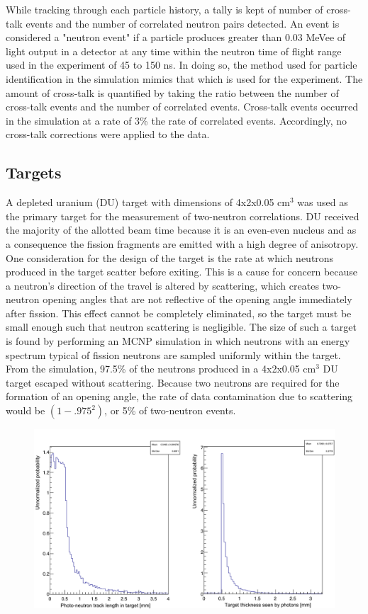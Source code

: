While tracking through each particle history, a tally is kept of number of cross-talk events and the number of correlated neutron pairs detected.
An event is considered a "neutron event" if a particle produces greater than 0.03 MeVee of light output in a detector at any time within the neutron time of flight range used in the experiment of 45 to 150 ns.
In doing so, the method used for particle identification in the simulation mimics that which is used for the experiment.
The amount of cross-talk is quantified by taking the ratio between the number of cross-talk events and the number of correlated events.
Cross-talk events occurred in the simulation at a rate of 3\% the rate of correlated events.
Accordingly, no cross-talk corrections were applied to the data.

\subsection{Targets}
A depleted uranium (DU) target with dimensions of 4x2x0.05 $\text{cm}^3$ was used as the primary target for the measurement of two-neutron correlations.
DU received the majority of the allotted beam time because it is an even-even nucleus and as a consequence the fission fragments are emitted with a high degree of anisotropy.
One consideration for the design of the target is the rate at which neutrons produced in the target scatter before exiting.
This is a cause for concern because a neutron's direction of the travel is altered by scattering, which creates two-neutron opening angles that are not reflective of the opening angle immediately after fission.
This effect cannot be completely eliminated, so the target must be small enough such that neutron scattering is negligible.
The size of such a target is found by performing an MCNP simulation in which neutrons with an energy spectrum typical of fission neutrons are sampled uniformly within the target.
From the simulation, 97.5\% of the neutrons produced in a 4x2x0.05 $\text{cm}^3$ DU target escaped without scattering.
Because two neutrons are required for the formation of an opening angle, the rate of data contamination due to scattering would be $(1-.975^2)$, or 5\% of two-neutron events.
\begin{figure}
    \centering
    \includegraphics[width = \textwidth]{Content/Methods/ScatteringInTarget.png}
    \caption{}
    \label{fig:ScatteringInTarget}
\end{figure}

